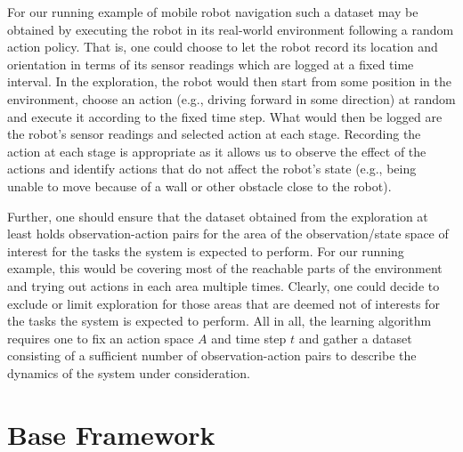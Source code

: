 For our running example of mobile robot navigation such a dataset may be obtained by executing the robot in its real-world environment following a random action policy.
That is, one could choose to let the robot record its location and orientation in terms of its sensor readings which are logged at a fixed time interval.
In the exploration, the robot would then start from some position in the environment, choose an action (e.g., driving forward in some direction) at random and execute it according to the fixed time step.
What would then be logged are the robot's sensor readings and selected action at each stage.
Recording the action at each stage is appropriate as it allows us to observe the effect of the actions and identify actions that do not affect the robot's state (e.g., being unable to move because of a wall or other obstacle close to the robot).

Further, one should ensure that the dataset obtained from the exploration at least holds observation-action pairs for the area of the observation/state space of interest for the tasks the system is expected to perform.
For our running example, this would be covering most of the reachable parts of the environment and trying out actions in each area multiple times.
Clearly, one could decide to exclude or limit exploration for those areas that are deemed not of interests for the tasks the system is expected to perform.
All in all, the learning algorithm requires one to fix an action space $A$ and time step $t$ and gather a dataset consisting of a sufficient number of observation-action pairs to describe the dynamics of the system under consideration.

\newpage

\section{Base Framework}
\label{sec:model-learning-routine}

